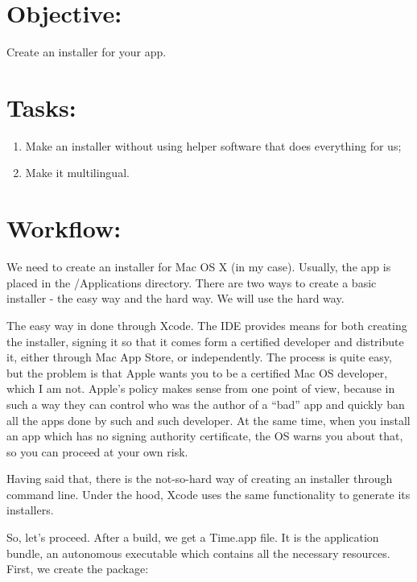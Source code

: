 \documentclass{article}        %
\begin{document}




\section*{Objective:}          %

Create an installer for your app.

\section*{Tasks:}
\begin{enumerate}
\item Make an installer without using helper software that does everything for us;
\item Make it multilingual.
\end{enumerate}

\section*{Workflow:} 

	We need to create an installer for Mac OS X (in my case). Usually, the app is placed in the /Applications directory. There are two ways to create a basic installer - the easy way and the hard way. We will use the hard way.

	The easy way in done through Xcode. The IDE provides means for both creating the installer, signing it so that it comes form a certified developer and distribute it, either through Mac App Store, or independently. The process is quite easy, but the problem is that Apple wants you to be a certified Mac OS developer, which I am not. Apple’s policy makes sense from one point of view, because in such a way they can control who was the author of a “bad” app and quickly ban all the apps done by such and such developer. At the same time, when you install an app which has no signing authority certificate, the OS warns you about that, so you can proceed at your own risk. 

	Having said that, there is the not-so-hard way of creating an installer through command line. Under the hood, Xcode uses the same functionality to generate its installers.

	So, let’s proceed. After a build, we get a Time.app file. It is the application bundle, an autonomous executable which contains all the necessary resources. First, we create the package:
\end{document}
